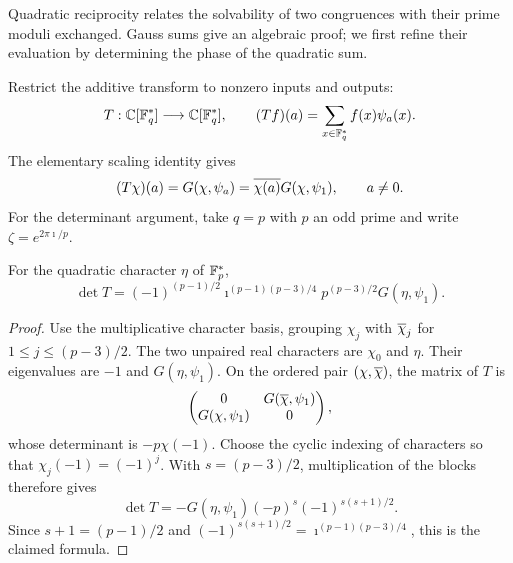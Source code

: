 Quadratic reciprocity relates the solvability of two congruences with their
prime moduli exchanged. Gauss sums give an algebraic proof; we first refine
their evaluation by determining the phase of the quadratic sum.

Restrict the
additive transform to nonzero inputs and outputs:
\[
 T:\mathbb{C}[\mathbb{F}_q^*]\longrightarrow\mathbb{C}[\mathbb{F}_q^*],\qquad
 (Tf)(a)=\sum_{x\in\mathbb{F}_q^*}f(x)\psi_a(x).
\]
The elementary scaling identity gives
\begin{equation}
\label{eq-expression-operator-t-char-mult}
 (T\chi)(a)=G(\chi,\psi_a)=\overline{\chi(a)}G(\chi,\psi_1),
 \qquad a\neq0.
\end{equation}
For the determinant argument, take $q=p$ with $p$ an odd prime and write
$\zeta=e^{2\pi\imath/p}$.


\begin{lem}
\label{lem-calcul-det-T}
For the quadratic character $\eta$ of $\mathbb{F}_p^*$,
\[
 \det T=(-1)^{(p-1)/2}\imath^{(p-1)(p-3)/4}
         p^{(p-3)/2}G(\eta,\psi_1).
\]
\end{lem}
\begin{proof}
Use the multiplicative character basis, grouping $\chi_j$ with
$\overline{\chi}_j$ for $1\leq j\leq(p-3)/2$. The two unpaired real characters are
$\chi_0$ and $\eta$. Their eigenvalues are $-1$ and $G(\eta,\psi_1)$.
On the ordered pair $(\chi,\overline{\chi})$, the matrix of $T$ is
\[
 \begin{pmatrix}0&G(\overline{\chi},\psi_1)\\G(\chi,\psi_1)&0\end{pmatrix},
\]
whose determinant is $-p\chi(-1)$. Choose the cyclic indexing of characters
so that $\chi_j(-1)=(-1)^j$. With $s=(p-3)/2$, multiplication of the blocks
therefore gives
\[
 \det T=-G(\eta,\psi_1)(-p)^s(-1)^{s(s+1)/2}.
\]
Since $s+1=(p-1)/2$ and
$(-1)^{s(s+1)/2}=\imath^{(p-1)(p-3)/4}$, this is the claimed formula.
\end{proof}


